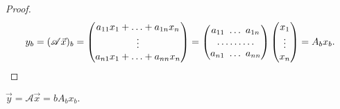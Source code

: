 \begin{proof}
    \begin{equation*}
        y_b = (\mathscr{A}\vec{x})_b = \begin{pmatrix} 
            a_{11}x_1 + \ldots + a_{1n}x_n \\
            \vdots \\
            a_{n1}x_1 + \ldots + a_{nn}x_n
        \end{pmatrix} =
        \begin{pmatrix} 
            a_{11} \thinspace \thinspace \ldots \thinspace \thinspace a_{1n} \\
            \ldots \ldots \ldots \\
            a_{n1} \thinspace \thinspace \ldots \thinspace \thinspace a_{nn}
        \end{pmatrix}
        \begin{pmatrix} 
            x_1 \\
            \vdots \\
            x_n
        \end{pmatrix} = A_bx_b
    .\end{equation*}
\end{proof}

\begin{corollary}
    $\vec{y} = \mathscr{A}\vec{x} = bA_bx_b.$
\end{corollary}

